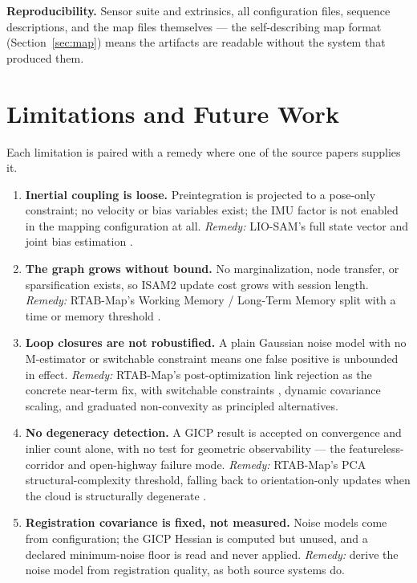\documentclass[conference]{IEEEtran}
\begin{document}
\textbf{Reproducibility.} Sensor suite and extrinsics, all configuration files, sequence descriptions, and the map files themselves --- the self-describing map format (Section~\ref{sec:map}) means the artifacts are readable without the system that produced them.

\section{Limitations and Future Work}
\label{sec:limitations}
Each limitation is paired with a remedy where one of the source papers supplies it.

\begin{enumerate}
    \item \textbf{Inertial coupling is loose.} Preintegration is projected to a pose-only constraint; no velocity or bias variables exist; the IMU factor is not enabled in the mapping configuration at all. \emph{Remedy:} LIO-SAM's full state vector and joint bias estimation \parencite{shan2020liosam}.
    \item \textbf{The graph grows without bound.} No marginalization, node transfer, or sparsification exists, so ISAM2 update cost grows with session length. \emph{Remedy:} RTAB-Map's Working Memory / Long-Term Memory split with a time or memory threshold \parencite{labbe2019rtabmap}.
    \item \textbf{Loop closures are not robustified.} A plain Gaussian noise model with no M-estimator or switchable constraint means one false positive is unbounded in effect. \emph{Remedy:} RTAB-Map's post-optimization link rejection as the concrete near-term fix, with switchable constraints \parencite{sunderhauf2012switchable}, dynamic covariance scaling, and graduated non-convexity as principled alternatives.
    \item \textbf{No degeneracy detection.} A GICP result is accepted on convergence and inlier count alone, with no test for geometric observability --- the featureless-corridor and open-highway failure mode. \emph{Remedy:} RTAB-Map's PCA structural-complexity threshold, falling back to orientation-only updates when the cloud is structurally degenerate \parencite{labbe2019rtabmap}.
    \item \textbf{Registration covariance is fixed, not measured.} Noise models come from configuration; the GICP Hessian is computed but unused, and a declared minimum-noise floor is read and never applied. \emph{Remedy:} derive the noise model from registration quality, as both source systems do.

\end{enumerate}
\end{document}
